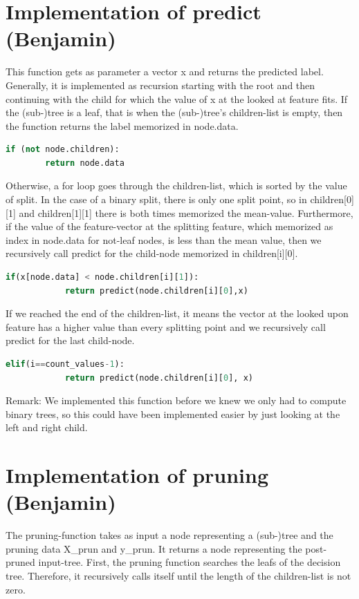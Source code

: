 \documentclass[12pt,a4paper]{scrartcl}		%
\begin{document}
\section{Implementation of predict (Benjamin)}
This function gets as parameter a vector x and returns the predicted label. Generally, it is implemented as 
recursion starting with the root and then continuing with the child for which the value of x at the looked 
at feature fits. 
If the (sub-)tree is a leaf, that is when the (sub-)tree’s children-list is empty, then the function returns 
the label memorized in node.data. 

\begin{lstlisting}[language=Python]
    if (not node.children):
        return node.data
\end{lstlisting}
 
Otherwise, a for loop goes through the children-list, which is sorted by the value of split. In the case of 
a binary split, there is only one split point, so in children[0][1] and children[1][1] there is both times 
memorized the mean-value. 
Furthermore, if the value of the feature-vector at the splitting feature, which memorized as index in node.data 
for not-leaf nodes, is less than the mean value, then we recursively call predict for the child-node memorized 
in children[i][0]. 

\begin{lstlisting}[language=Python]
    if(x[node.data] < node.children[i][1]):           
            return predict(node.children[i][0],x) 
\end{lstlisting}

If we reached the end of the children-list, it means the vector at the looked upon feature has a higher value 
than every splitting point and we recursively call predict for the last child-node. 

\begin{lstlisting}[language=Python]
    elif(i==count_values-1):                    
            return predict(node.children[i][0], x)
\end{lstlisting}

Remark: We implemented this function before we knew we only had to compute binary trees, so this could have 
been implemented easier by just looking at the left and right child.

\section{Implementation of pruning (Benjamin)}
The pruning-function takes as input a node representing a (sub-)tree and the pruning data X\_prun and y\_prun. 
It returns a node representing the post-pruned input-tree. 
First, the pruning function searches the leafs of the decision tree. Therefore, it recursively calls itself 
until the length of the children-list is not zero. 
\end{document}
